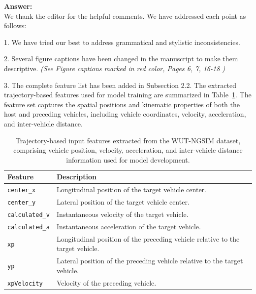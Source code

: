 \documentclass[12pt]{article}
\begin{document}
\begin{enumerate}
\textbf{Answer:\\} We thank the editor for the helpful comments. We have addressed each point as follows:

1. We have tried our best to address grammatical and stylistic inconsistencies. 

2. Several figure captions have been changed in the manuscript to make them descriptive. \textit{(See Figure captions marked in red color, Pages 6, 7, 16-18 )}

3. The complete feature list has been added in Subsection 2.2. The extracted trajectory-based features used for model training are summarized in Table~\ref{tab:feature_description}. The feature set captures the spatial positions and kinematic properties of both the host and preceding vehicles, including vehicle coordinates, velocity, acceleration, and inter-vehicle distance.

\begin{table}[H]
\caption{Trajectory-based input features extracted from the WUT-NGSIM dataset, comprising vehicle position, velocity, acceleration, and inter-vehicle distance information used for model development.\label{tab:feature_description}}

\begin{tabularx}{\textwidth}{|l|X|}
\hline
\textbf{Feature} & \textbf{Description} \\
\hline

\texttt{center\_x} &
Longitudinal position of the target vehicle center. \\
\hline

\texttt{center\_y} &
Lateral position of the target vehicle center. \\
\hline

\texttt{calculated\_v} &
Instantaneous velocity of the target vehicle. \\
\hline

\texttt{calculated\_a} &
Instantaneous acceleration of the target vehicle. \\
\hline

\texttt{xp} &
Longitudinal position of the preceding vehicle relative to the target vehicle. \\
\hline

\texttt{yp} &
Lateral position of the preceding vehicle relative to the target vehicle. \\
\hline

\texttt{xpVelocity} &
Velocity of the preceding vehicle. \\
\hline


\end{tabularx}
\end{table}
\end{enumerate}
\end{document}
